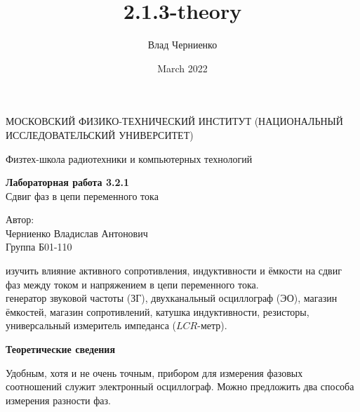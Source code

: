 \documentclass[a4paper, 12pt]{article}
\title{2.1.3-theory}
\author{Влад Черниенко}
\date{March 2022}
\begin{document}
    \begin{titlepage}
    
        \begin{center}
            {\large МОСКОВСКИЙ ФИЗИКО-ТЕХНИЧЕСКИЙ ИНСТИТУТ (НАЦИОНАЛЬНЫЙ ИССЛЕДОВАТЕЛЬСКИЙ УНИВЕРСИТЕТ)}
        \end{center}
        \begin{center}
            {\large Физтех-школа радиотехники и компьютерных технологий}
        \end{center}
        
        \vspace{4.5cm}
        
        {\huge
            \begin{center}
                {\bf Лабораторная работа 3.2.1} \\
                Сдвиг фаз в цепи переменного тока
            \end{center}
        }
        
        \vspace{12cm}
        
        \begin{flushright}
            {\LARGE Автор: \\ Черниенко Владислав Антонович \\ \vspace{0.2cm} Группа Б01-110}
        \end{flushright}
        
    \end{titlepage}
    
    
     изучить влияние активного сопротивления, индуктивности и ёмкости на сдвиг фаз между током и напряжением в цепи переменного тока.\\
    
     генератор звуковой частоты (ЗГ), двухканальный осциллограф (ЭО), магазин ёмкостей, магазин сопротивлений, катушка индуктивности, резисторы, универсальный измеритель импеданса ($LCR$-метр).\\
    
    \begin{flushleft}
        {\Large {\bf Теоретические сведения}}
    \end{flushleft}
    
    Удобным, хотя и не очень точным, прибором для измерения фазовых соотношений служит электронный осциллограф. Можно предложить два способа измерения разности фаз.
    
\end{document}
